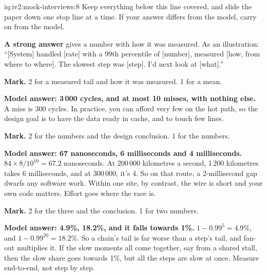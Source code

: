 \begin{solution}{iq:iv2:mock-interviews:8}
Keep everything below this line covered, and slide the paper down one stop line at a time. If your answer differs from the model, carry on from the model.

\ivstop
\textbf{A strong answer} gives a number with how it was measured. As an illustration: ``[System] handled [rate] with a 99th percentile of [number], measured [how, from where to where]. The slowest step was [step]. I'd next look at [what].''

\textbf{Mark.} 2 for a measured tail and how it was measured. 1 for a mean.

\ivstop
\textbf{Model answer: 3\,000 cycles, and at most 10 misses, with nothing else.} A miss is 300 cycles. In practice, you can afford very few on the hot path, so the design goal is to have the data ready in cache, and to touch few lines.

\textbf{Mark.} 2 for the numbers and the design conclusion. 1 for the numbers.

\ivstop
\textbf{Model answer: 67 nanoseconds, 6 milliseconds and 4 milliseconds.} $84 \times 8/10^{10} = 67.2$ nanoseconds. At 200\,000 kilometres a second, 1\,200 kilometres takes 6 milliseconds, and at 300\,000, it's 4. So on that route, a 2-millisecond gap dwarfs any software work. Within one site, by contrast, the wire is short and your own code matters. Effort goes where the race is.

\textbf{Mark.} 2 for the three and the conclusion. 1 for two numbers.

\ivstop
\textbf{Model answer: 4.9\%, 18.2\%, and it falls towards 1\%.} $1 - 0.99^5 = 4.9\%$, and $1 - 0.99^{20} = 18.2\%$. So a chain's tail is far worse than a step's tail, and fan-out multiplies it. If the slow moments all come together, say from a shared stall, then the slow share goes towards 1\%, but all the steps are slow at once. Measure end-to-end, not step by step.


\end{solution}
